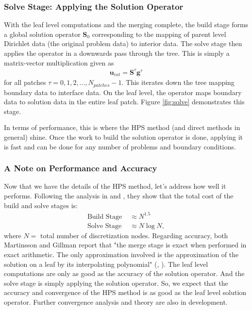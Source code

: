 \subsubsection{Solve Stage: Applying the Solution Operator}

With the leaf level computations and the merging complete, the build stage forms a global solution operator $\textbf{S}_0$ corresponding to the mapping of parent level Dirichlet data (the original problem data) to interior data. The solve stage then applies the operator in a downwards pass through the tree. This is simply a matrix-vector multiplication given as
\begin{align}
    \textbf{u}_{int} = \textbf{S}^{\tau} \textbf{g}^{\tau}
\end{align}
for all patches $\tau = 0, 1, 2, ..., N_{patches} - 1$. This iterates down the tree mapping boundary data to interface data. On the leaf level, the operator maps boundary data to solution data in the entire leaf patch. Figure \ref{fig:solve} demonstrates this stage.

In terms of performance, this is where the HPS method (and direct methods in general) shine. Once the work to build the solution operator is done, applying it is fast and can be done for any number of problems and boundary conditions.

\subsubsection{A Note on Performance and Accuracy}

Now that we have the details of the HPS method, let's address how well it performs. Following the analysis in \cite{martinsson2015hierarchical} and \cite{gillman2014direct}, they show that the total cost of the build and solve stages is:
\begin{align}
    \text{Build Stage }& \approx N^{1.5} \\
    \text{Solve Stage }& \approx N \log N,
\end{align}
where $N = $ total number of discretization nodes. Regarding accuracy, both Martinsson and Gillman report that "the merge stage is exact when performed in exact arithmetic. The only approximation involved is the approximation of the solution on a leaf by its interpolating polynomial" (\cite{martinsson2015hierarchical}, \cite{gillman2014direct}). The leaf level computations are only as good as the accuracy of the solution operator. And the solve stage is simply applying the solution operator. So, we expect that the accuracy and convergence of the HPS method is as good as the leaf level solution operator. Further convergence analysis and theory are also in development.

